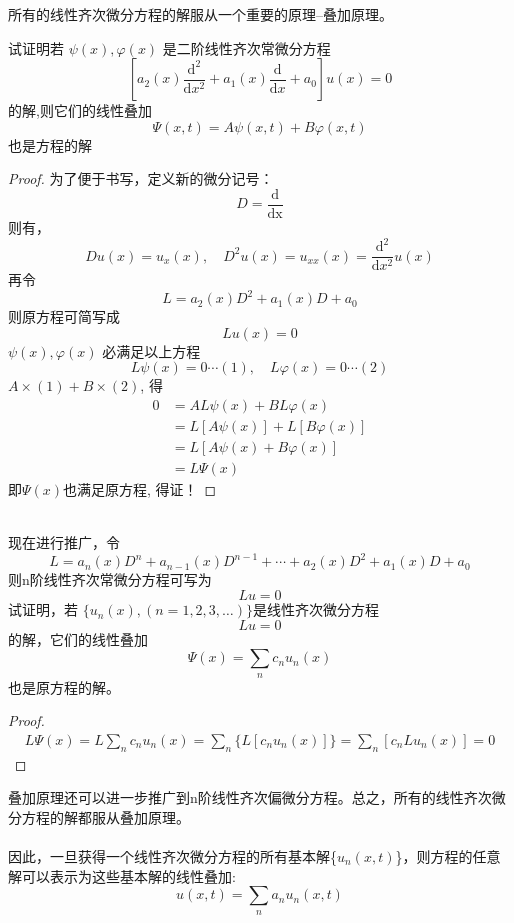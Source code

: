 所有的线性齐次微分方程的解服从一个重要的原理--叠加原理。
 \begin{example}
	 试证明若 $\psi(x), \varphi(x)$ 是二阶线性齐次常微分方程
	 \begin{equation*}
		\left[a_2 (x) \frac{\mathrm{d^2}}{\mathrm{d}x^2} + a_1 (x)\frac{\mathrm{d}}{\mathrm{d}x} + a_0 \right]u(x)  = 0
	 \end{equation*} 
	 的解,则它们的线性叠加
	 \begin{equation*}
		 \Psi(x,t) = A \psi(x,t) + B \varphi(x,t)
	 \end{equation*} 
	 也是方程的解
	 \end{example}
	 \begin{proof}
	为了便于书写，定义新的微分记号：$$D = \frac{\mathrm{d}}{\mathrm{d x}}$$
	则有，
	$$ Du(x) = u_{x}(x), \quad D^2 u(x) = u_{xx}(x) = \frac{\mathrm{d^2}}{\mathrm{d}x^2} u(x) $$
	再令
	$$ L = a_2 (x) D^2 + a_1 (x) D +  a_0 $$
	则原方程可简写成
	$$ Lu(x)=0 $$
	 $\psi(x), \varphi(x)$ 必满足以上方程
	 \begin{equation*}
		L\psi(x)=0  \cdots (1), \quad L\varphi(x)=0  \cdots (2)
	 \end{equation*} 
	 $A\times (1) + B\times (2) $, 得
	 $$ \begin{aligned}
		 0 &= AL\psi(x)+ BL\varphi(x) \\
		&= L[A\psi(x)]+ L[B\varphi(x)] \\
		&= L[A\psi(x)+ B\varphi(x)] \\
		&= L\Psi(x)
	 \end{aligned}$$
	 即$ \Psi(x) $也满足原方程, 得证！
	 \end{proof}
    ~~\\ 
	 现在进行推广，令 $$ L = a_n (x) D^n + a_{n-1} (x) D^{n-1} + \cdots + a_2 (x) D^2 + a_1 (x) D +  a_0 $$
	 则n阶线性齐次常微分方程可写为
	 $$ Lu=0 $$
	 试证明，若 $\{u_n(x), (n=1,2,3,\dots) \}$是线性齐次微分方程
	$$Lu=0$$
	的解，它们的线性叠加
	$$\Psi(x)=\sum_n c_n u_n(x) $$
	也是原方程的解。
	\begin{proof}
	$$ \begin{aligned}
		L\Psi(x) = L\sum_n c_n u_n(x) = \sum_n \{L[c_n u_n(x)]\} = \sum_n [c_n L u_n(x)] = 0
	\end{aligned}$$
    \end{proof}
	叠加原理还可以进一步推广到n阶线性齐次偏微分方程。总之，所有的线性齐次微分方程的解都服从叠加原理。\\
	~~\\ 
	因此，一旦获得一个线性齐次微分方程的所有基本解\{$u_n(x,t)$\}，则方程的任意解可以表示为这些基本解的线性叠加:
	\begin{equation}
		u(x,t) = \sum_n a_n u_n(x,t)
	\end{equation}

